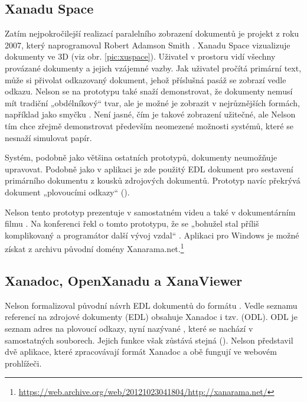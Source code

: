 \subsection{Xanadu Space}
\label{sec:xuspace}


Zatím nejpokročilejší realizací paralelního zobrazení dokumentů je projekt  z roku 2007, který naprogramoval Robert Adamson Smith \autocite{Nelson:XanaduSpace}. Xanadu Space vizualizuje dokumenty ve 3D (viz obr. \ref{pic:xuspace}). Uživatel v prostoru vidí všechny provázané dokumenty a jejich vzájemné vazby. Jak uživatel pročítá primární text, může si přivolat odkazovaný dokument, jehož příslušná pasáž se zobrazí vedle odkazu. Nelson se na prototypu také snaží demonstrovat, že dokumenty nemusí mít tradiční „obdélníkový“ tvar, ale je možné je zobrazit v nejrůznějších formách, například jako smyčku \autocite{Nelson:XanaduSpace}. Není jasné, čím je takové zobrazení užitečné, ale Nelson tím chce zřejmě demonstrovat především neomezené možnosti systémů, které se nesnaží simulovat papír.

Systém, podobně jako většina ostatních prototypů, dokumenty neumožňuje upravovat. Podobně jako v aplikaci  je zde použitý EDL dokument pro sestavení primárního dokumentu z kousků zdrojových dokumentů. Prototyp navíc překrývá dokument „plovoucími odkazy“ ().

Nelson tento prototyp prezentuje v samostatném videu \autocite{Nelson:vid:xuspace} a také v dokumentárním filmu \textcite{Herzog2016}. Na konferenci  řekl o tomto prototypu, že se „bohužel stal příliš komplikovaný a programátor další vývoj vzdal“ \autocite{Nelson2015}. Aplikaci pro Windows je možné získat z archivu původní domény Xanarama.net.\footnote{\url{https://web.archive.org/web/20121023041804/http://xanarama.net/}}

\subsection{Xanadoc, OpenXanadu a XanaViewer}
\label{sec:xanadoc}

Nelson formalizoval původní návrh EDL dokumentů do formátu  \autocite{xanasimp}. Vedle seznamu referencí na zdrojové dokumenty (EDL) obsahuje Xanadoc i tzv.  (ODL). ODL je seznam adres na plovoucí odkazy, nyní nazývané , které se nachází v samostatných souborech. Jejich funkce však zůstává stejná (). Nelson představil dvě aplikace, které zpracovávají formát Xanadoc a obě fungují ve webovém prohlížeči.

